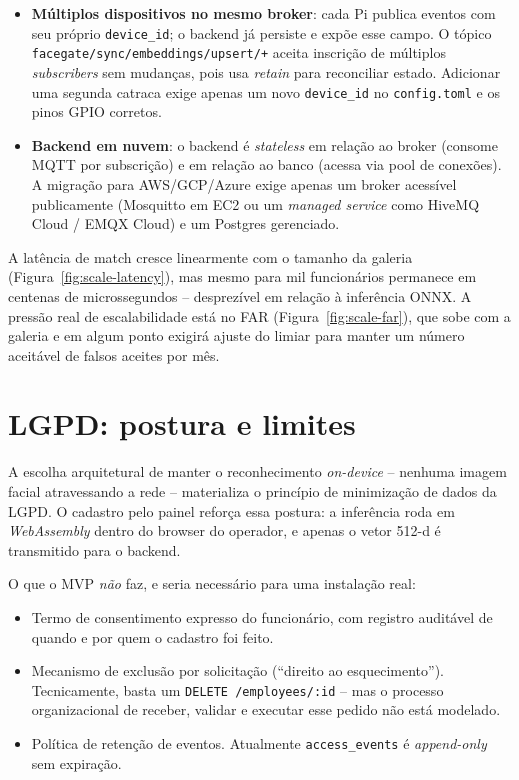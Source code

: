 \documentclass[12pt,a4paper]{report}
\begin{document}
\begin{itemize}
    \item \textbf{Múltiplos dispositivos no mesmo broker}: cada Pi
        publica eventos com seu próprio \texttt{device\_id}; o
        backend já persiste e expõe esse campo. O tópico
        \texttt{facegate/sync/embeddings/upsert/+} aceita inscrição
        de múltiplos \textit{subscribers} sem mudanças, pois usa
        \textit{retain} para reconciliar estado. Adicionar uma segunda
        catraca exige apenas um novo \texttt{device\_id} no
        \texttt{config.toml} e os pinos GPIO corretos.
    \item \textbf{Backend em nuvem}: o backend é \textit{stateless} em
        relação ao broker (consome MQTT por subscrição) e em relação
        ao banco (acessa via pool de conexões). A migração para
        AWS/GCP/Azure exige apenas um broker acessível
        publicamente (Mosquitto em EC2 ou um \textit{managed service}
        como HiveMQ Cloud / EMQX Cloud) e um Postgres gerenciado.
\end{itemize}

A latência de match cresce linearmente com o tamanho da galeria
(Figura~\ref{fig:scale-latency}), mas mesmo para mil funcionários
permanece em centenas de microssegundos -- desprezível em relação à
inferência ONNX. A pressão real de escalabilidade está no FAR
(Figura~\ref{fig:scale-far}), que sobe com a galeria e em algum ponto
exigirá ajuste do limiar para manter um número aceitável de falsos
aceites por mês.

\section{LGPD: postura e limites}

A escolha arquitetural de manter o reconhecimento
\textit{on-device} -- nenhuma imagem facial atravessando a rede --
materializa o princípio de minimização de dados da LGPD. O cadastro
pelo painel reforça essa postura: a inferência roda em
\textit{WebAssembly} dentro do browser do operador, e apenas o vetor
512-d é transmitido para o backend.

O que o MVP \emph{não} faz, e seria necessário para uma instalação
real:

\begin{itemize}
    \item Termo de consentimento expresso do funcionário, com
        registro auditável de quando e por quem o cadastro foi
        feito.
    \item Mecanismo de exclusão por solicitação (``direito ao
        esquecimento''). Tecnicamente, basta um
        \texttt{DELETE /employees/:id} -- mas o processo organizacional
        de receber, validar e executar esse pedido não está
        modelado.
    \item Política de retenção de eventos. Atualmente
        \texttt{access\_events} é \textit{append-only} sem expiração.
\end{itemize}
\end{document}
